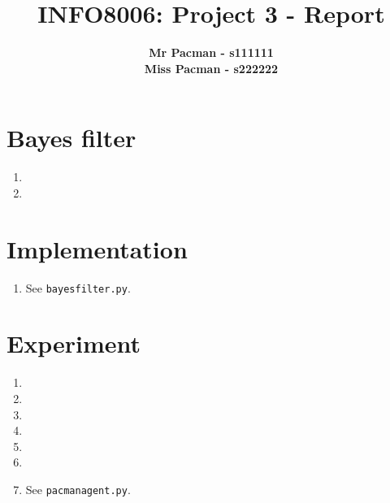 \documentclass{article}
\begin{document}

\title{\Large{INFO8006: Project 3 - Report}}
\vspace{1cm}
\author{\small{\bf Mr Pacman - s111111} \\ \small{\bf Miss Pacman - s222222}}

\maketitle


\section{Bayes filter}

\begin{enumerate}[label=\alph*.]
    \item
    \item
\end{enumerate}

\section{Implementation}

\begin{enumerate}[label=\alph*.]
    \item See \texttt{bayesfilter.py}.
\end{enumerate}

\section{Experiment}

\begin{enumerate}[label=\alph*.]
    \item
    \item
    \item
    \item
    \item
    \item
    \item See \texttt{pacmanagent.py}.
\end{enumerate}

\end{document}
